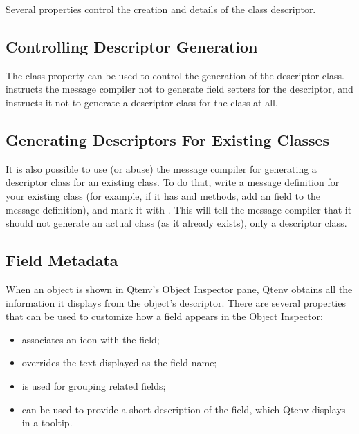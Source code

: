 Several properties control the creation and details of the class descriptor.


\subsection{Controlling Descriptor Generation}
\label{sec:msg-defs:descriptor-property}

The  class property can be used to control the generation
of the descriptor class.  instructs the message
compiler not to generate field setters for the descriptor, and
 instructs it not to generate a descriptor class
for the class at all.


\subsection{Generating Descriptors For Existing Classes}
\label{sec:msg-defs:descriptor-existingclass-property}

It is also possible to use (or abuse) the message compiler for generating a
descriptor class for an existing class. To do that, write a message definition
for your existing class (for example, if it has  and
 methods, add an  field to the message
definition), and mark it with . This will tell the message
compiler that it should not generate an actual class (as it already exists),
only a descriptor class.

\subsection{Field Metadata}
\label{sec:msg-defs:descriptor-field-meadata}

When an object is shown in Qtenv's Object Inspector pane, Qtenv obtains all the
information it displays from the object's descriptor. There are several
properties that can be used to customize how a field appears in the Object
Inspector:

\begin{itemize}
  \item {} associates an icon with the field;
  \item {} overrides the text displayed as the field name;
  \item {} is used for grouping related fields;
  \item {} can be used to provide a short description of the field,
    which Qtenv displays in a tooltip.
\end{itemize}



